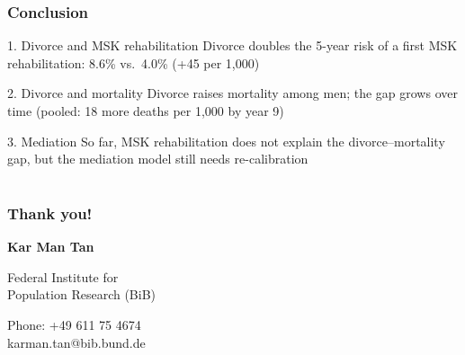 \documentclass[t,20pt]{beamer}
\begin{document}
\begin{bibframe}
  \frametitle{Conclusion}
  \begin{block}{1. Divorce and MSK rehabilitation}
    Divorce doubles the 5-year risk of a first MSK rehabilitation: 8.6\% vs.\ 4.0\% (+45 per 1,000)
  \end{block}
  \begin{block}{2. Divorce and mortality}
    Divorce raises mortality among men; the gap grows over time (pooled: 18 more deaths per 1,000 by year 9)
  \end{block}
  \begin{block}{3. Mediation}
    So far, MSK rehabilitation does not explain the divorce--mortality gap, but the mediation model still needs re-calibration
  \end{block}
\end{bibframe}

\section*{}
\begin{bibframe}[frametype=thankyouen]
  \frametitle{Thank you!}
  \large
  \vspace{2cm}
  \textbf{Kar Man Tan}\par
  \vspace{1cm}
  Federal Institute for\\
  Population Research (BiB)\par
  \vspace{1cm}
  Phone: +49 611 75 4674\\
  karman.tan@bib.bund.de
\end{bibframe}
\end{document}
